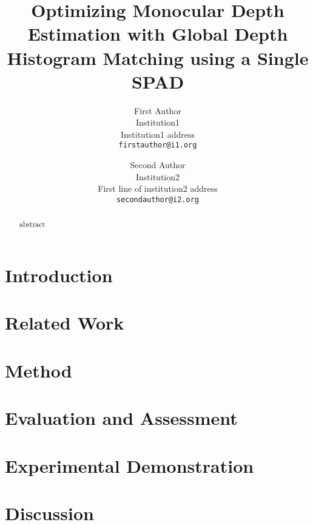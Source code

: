 \documentclass[10pt,twocolumn,letterpaper]{article}
\begin{document}
\title{Optimizing Monocular Depth Estimation with Global Depth Histogram Matching using a Single SPAD}

\author{First Author\\
Institution1\\
Institution1 address\\
{\tt\small firstauthor@i1.org}
\and
Second Author\\
Institution2\\
First line of institution2 address\\
{\tt\small secondauthor@i2.org}
}

\maketitle

\begin{abstract}
abstract
\end{abstract}


\section{Introduction}
\label{sec:intro}


\section{Related Work}
\label{sec:related}


\section{Method}
\label{sec:method}


\section{Evaluation and Assessment}
\label{sec:evaluation}


\section{Experimental Demonstration}
\label{sec:prototype}


\section{Discussion}
\label{sec:discussion}


{\small


}
\end{document}

